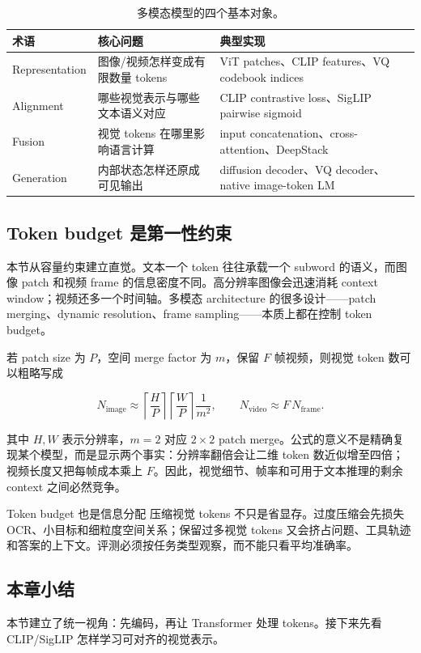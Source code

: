 \begin{table}[H]
\centering
\begin{tabular}{L{0.19\textwidth}L{0.31\textwidth}L{0.4\textwidth}}
\toprule
术语 & 核心问题 & 典型实现 \\
\midrule
Representation & 图像/视频怎样变成有限数量 tokens & ViT patches、CLIP features、VQ codebook indices \\
Alignment & 哪些视觉表示与哪些文本语义对应 & CLIP contrastive loss、SigLIP pairwise sigmoid \\
Fusion & 视觉 tokens 在哪里影响语言计算 & input concatenation、cross-attention、DeepStack \\
Generation & 内部状态怎样还原成可见输出 & diffusion decoder、VQ decoder、native image-token LM \\
\bottomrule
\end{tabular}
\caption{多模态模型的四个基本对象。}
\end{table}

\subsection{Token budget 是第一性约束}

本节从容量约束建立直觉。文本一个 token 往往承载一个 subword 的语义，而图像 patch 和视频 frame 的信息密度不同。高分辨率图像会迅速消耗 context window；视频还多一个时间轴。多模态 architecture 的很多设计——patch merging、dynamic resolution、frame sampling——本质上都在控制 token budget。

若 patch size 为 $P$，空间 merge factor 为 $m$，保留 $F$ 帧视频，则视觉 token 数可以粗略写成

$$
N_{\mathrm{image}}\approx
\left\lceil\frac{H}{P}\right\rceil
\left\lceil\frac{W}{P}\right\rceil\frac{1}{m^2},
\qquad
N_{\mathrm{video}}\approx F\,N_{\mathrm{frame}}.
$$

其中 $H,W$ 表示分辨率，$m=2$ 对应 $2\times2$ patch merge。公式的意义不是精确复现某个模型，而是显示两个事实：分辨率翻倍会让二维 token 数近似增至四倍；视频长度又把每帧成本乘上 $F$。因此，视觉细节、帧率和可用于文本推理的剩余 context 之间必然竞争。

\begin{warningbox}{Token budget 也是信息分配}
压缩视觉 tokens 不只是省显存。过度压缩会先损失 OCR、小目标和细粒度空间关系；保留过多视觉 tokens 又会挤占问题、工具轨迹和答案的上下文。评测必须按任务类型观察，而不能只看平均准确率。
\end{warningbox}

\subsection{本章小结}

本节建立了统一视角：先编码，再让 Transformer 处理 tokens。接下来先看 CLIP/SigLIP 怎样学习可对齐的视觉表示。

